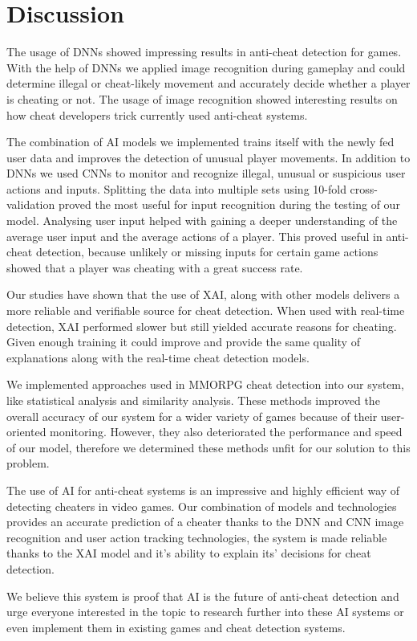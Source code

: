\section{Discussion}
\label{ch:discussion}

The usage of DNNs showed impressing results in anti-cheat detection for games. 
With the help of DNNs we applied image recognition during gameplay and could determine illegal or cheat-likely movement and accurately decide whether a player is cheating or not. The usage of image recognition showed interesting results on how cheat developers trick currently used anti-cheat systems. 

The combination of AI models we implemented trains itself with the newly fed user data and improves the detection of unusual player movements. In addition to DNNs we used CNNs to monitor and recognize illegal, unusual or suspicious user actions and inputs.
Splitting the data into multiple sets using 10-fold cross-validation proved the most useful for input recognition during the testing of our model.
Analysing user input helped with gaining a deeper understanding of the average user input and the average actions of a player. This proved useful in anti-cheat detection, because unlikely or missing inputs for certain game actions showed that a player was cheating with a great success rate.

Our studies have shown that the use of XAI, along with other models delivers a more reliable and verifiable source for cheat detection. When used with real-time detection, XAI performed slower but still yielded accurate reasons for cheating. Given enough training it could improve and provide the same quality of explanations along with the real-time cheat detection models.

We implemented approaches used in MMORPG cheat detection into our system, like statistical analysis and similarity analysis. These methods improved the overall accuracy of our system for a wider variety of games because of their user-oriented monitoring. However, they also deteriorated the performance and speed of our model, therefore we determined these methods unfit for our solution to this problem.

The use of AI for anti-cheat systems is an impressive and highly efficient way of detecting cheaters in video games. Our combination of models and technologies provides an accurate prediction of a cheater thanks to the DNN and CNN image recognition and user action tracking technologies, the system is made reliable thanks to the XAI model and it's ability to explain its' decisions for cheat detection.

We believe this system is proof that AI is the future of anti-cheat detection and urge everyone interested in the topic to research further into these AI systems or even implement them in existing games and cheat detection systems.